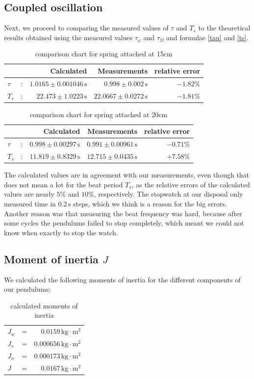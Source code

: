 \documentclass{scrreprt}
\newcommand{\unit}[1]{\ensuremath{\, \mathrm{#1}}}
\begin{document}
\subsection{Coupled oscillation}
Next, we proceed to comparing the measured values of $\tau$ and $T_s$ to the theoretical results obtained using the measured values $\tau_\omega$ and $\tau_\Omega$ and formulae \ref{tau} and \ref{ts}.
\begin{table}[H]
	\centering
	\begin{tabular}{lcrrr}
	&&Calculated&Measurements&relative error\\ \hline
	$\tau$&:& $1.0165 \pm	0.001046 \unit{s}$&$0.998 \pm 0.002 \unit{s}$&$-1.82\% $\\
	$T_s$ &:& $22.473  \pm 1.0223\unit{s}$ &$22.0667 \pm 0.0272\unit{s}$ & $-1.81\%$\\
	\end{tabular}
	\caption{comparison chart for spring attached at 15cm}
\end{table}

\begin{table}[H]
	\centering
	\begin{tabular}{lcrrr}
	&&Calculated&Measurements&relative error\\  \hline
	$\tau$&:& $0.998 \pm 0.00297 \unit{s}$&$0.991 \pm	0.00961\unit{s}$&$-0.71\% $\\
	$T_s$ &:& $11.819 \pm 0.8329\unit{s}$ &$12.715 \pm	0.0435\unit{s}$ & $+7.58\%$\\
	\end{tabular}
	\caption{comparison chart for spring attached at 20cm}
\end{table}

The calculated values are in agreement with our measurements, even though that does not mean a lot for the beat period $T_s$, as the relative errors of the calculated values are nearly $5\%$ and $10\%$, respectively. The stopwatch at our disposal only measured time in $0.2\unit{s}$ steps, which we think is a reason for the big errors. Another reason was that measuring the beat frequency was hard, because after some cycles the pendulums failed to stop completely, which meant we could not know when exactly to stop the watch.

\subsection{Moment of inertia $J$}
We calculated the following moments of inertia for the different components of our pendulums:
\begin{table}[H]
	\centering
	\begin{tabular}{lcr}
	$J_w$&=&$0.0159\unit{kg \cdot m^2}$\\
	$J_s$&=&$0.000656\unit{kg \cdot m^2}$\\
	$J_n$&=&$0.000173\unit{kg \cdot m^2}$\\ \hline
	$J$ &=& $0.0167 \unit{kg \cdot m^2}$
	\end{tabular}
	\caption{calculated moments of inertia}
\end{table}
\end{document}
